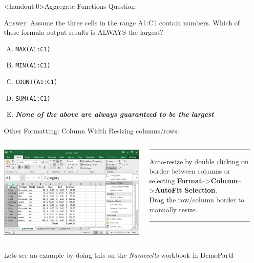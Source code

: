 \documentclass[xcolor=svgnames]{beamer}
\newcommand{\answer}[1]{\textit{\textbf{\textcolor{iyellow}{#1}}}}
\begin{document}
\begin{frame}<handout:0>{Aggregate Functions Question}
  \begin{block}{Answer:}
Assume the three cells in the range A1:C1 contain numbers.  Which of these formula output results is ALWAYS the largest?
\begin{enumerate}[A)]
\item {\tt MAX(A1:C1)}
\item {\tt MIN(A1:C1)}
\item {\tt COUNT(A1:C1)}
\item {\tt SUM(A1:C1)}
\item \answer{None of the above are always guaranteed to be the largest}
\end{enumerate}
 \end{block} 
\end{frame}



\begin{frame}{Other Formatting: Column Width}
 {Resizing columns/rows:}
\begin{columns}[T] %
\begin{column}{.65\textwidth}
 \includegraphics[width=1.1\textwidth]{ColWidth.png}
\end{column}%
\hfill%
\begin{column}{.33\textwidth}
{\color{blue}\rule{\linewidth}{4pt}}
Auto-resize by double clicking on border between columns or selecting \textbf{Format}-->\textbf{Column}-->\textbf{AutoFit Selection}.\\[1em]
Drag the row/column border to manually resize.
{\color{blue}\rule{\linewidth}{4pt}}
\end{column}%
\end{columns}
Lets see an example by doing this on the \textit{Namecells} workbook in DemoPartI
\end{frame}
\end{document}
